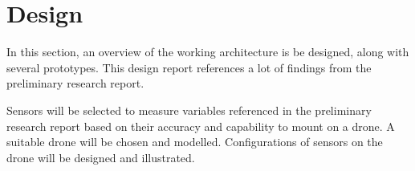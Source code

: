 \newpage
\section{Design}
In this section, an overview of the working architecture is be designed, along with several prototypes. This design report references a lot of findings from the preliminary research report.

Sensors will be selected to measure variables referenced in the preliminary research report based on their accuracy and capability to mount on a drone. A suitable drone will be chosen and modelled. Configurations of sensors on the drone will be designed and illustrated.





